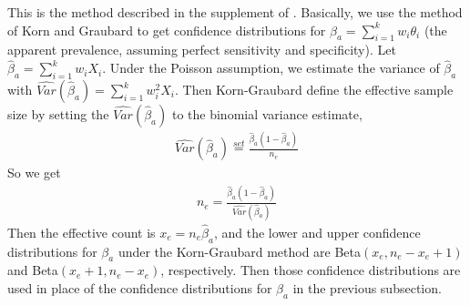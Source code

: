 \documentclass{article}
\begin{document}
This is the method described in the supplement of \citet{Kali:2021}.
Basically, we use the method of Korn and Graubard to get confidence distributions for ${\beta}_a = \sum_{i=1}^{k} w_i \theta_i$ (the apparent prevalence, assuming perfect sensitivity and specificity).
Let $\hat{\beta}_a= \sum_{i=1}^{k} w_i X_i$. Under the Poisson assumption, we estimate the variance 
of $\hat{\beta}_a$ with $\widehat{Var}(\hat{\beta}_a) = \sum_{i=1}^{k} w_i^2 X_i$. Then Korn-Graubard define the effective sample size by setting the $\widehat{Var}(\hat{\beta}_a)$ to the binomial variance estimate,
\begin{eqnarray*}
\widehat{Var}(\hat{\beta}_a) \stackrel{set}{=} \frac{\hat{\beta}_a (1-\hat{\beta}_a)}{n_e}
\end{eqnarray*}
So we get 
\begin{eqnarray*}
n_e =   \frac{\hat{\beta}_a (1-\hat{\beta}_a)}{\widehat{Var}(\hat{\beta}_a)}
\end{eqnarray*}
Then the effective count is $x_e = n_e \hat{\beta}_a$, and the lower and upper confidence distributions for ${\beta}_a$ under the Korn-Graubard method are Beta$(x_e, n_e-x_e+1)$ and Beta$(x_e+1,n_e-x_e)$, respectively. 
Then those confidence distributions are used in place of the confidence distributions for $\beta_a$ in the previous subsection. 



%




\end{document}
